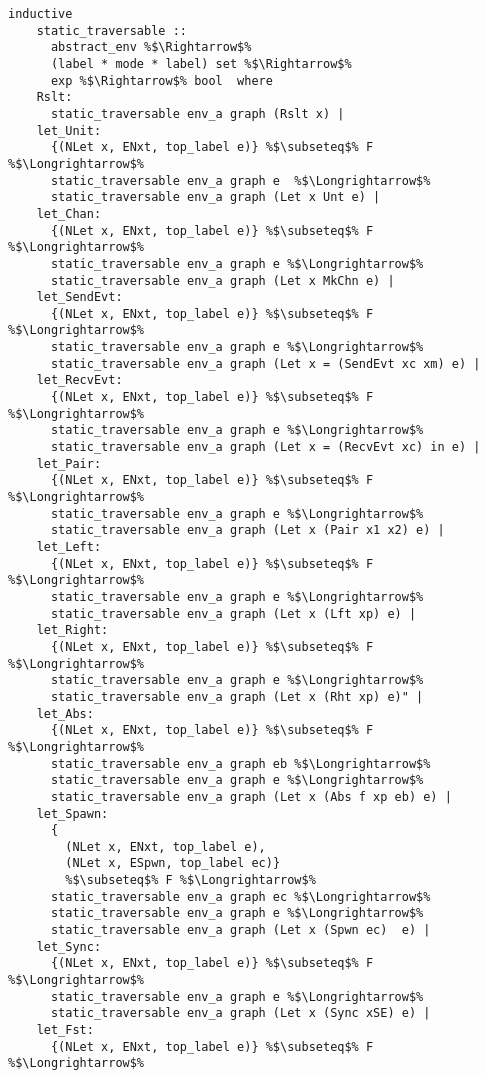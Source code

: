\begin{lstlisting}[style=codestyle1, escapechar=\%]
  inductive
    static_traversable ::
      abstract_env %$\Rightarrow$%
      (label * mode * label) set %$\Rightarrow$%
      exp %$\Rightarrow$% bool  where
    Rslt:
      static_traversable env_a graph (Rslt x) |
    let_Unit:
      {(NLet x, ENxt, top_label e)} %$\subseteq$% F %$\Longrightarrow$%
      static_traversable env_a graph e  %$\Longrightarrow$%
      static_traversable env_a graph (Let x Unt e) |
    let_Chan:
      {(NLet x, ENxt, top_label e)} %$\subseteq$% F %$\Longrightarrow$%
      static_traversable env_a graph e %$\Longrightarrow$%
      static_traversable env_a graph (Let x MkChn e) |
    let_SendEvt:
      {(NLet x, ENxt, top_label e)} %$\subseteq$% F %$\Longrightarrow$%
      static_traversable env_a graph e %$\Longrightarrow$%
      static_traversable env_a graph (Let x = (SendEvt xc xm) e) |
    let_RecvEvt:
      {(NLet x, ENxt, top_label e)} %$\subseteq$% F %$\Longrightarrow$%
      static_traversable env_a graph e %$\Longrightarrow$%
      static_traversable env_a graph (Let x = (RecvEvt xc) in e) |
    let_Pair:
      {(NLet x, ENxt, top_label e)} %$\subseteq$% F %$\Longrightarrow$%
      static_traversable env_a graph e %$\Longrightarrow$%
      static_traversable env_a graph (Let x (Pair x1 x2) e) |
    let_Left:
      {(NLet x, ENxt, top_label e)} %$\subseteq$% F %$\Longrightarrow$%
      static_traversable env_a graph e %$\Longrightarrow$%
      static_traversable env_a graph (Let x (Lft xp) e) |
    let_Right:
      {(NLet x, ENxt, top_label e)} %$\subseteq$% F %$\Longrightarrow$%
      static_traversable env_a graph e %$\Longrightarrow$%
      static_traversable env_a graph (Let x (Rht xp) e)" |
    let_Abs:
      {(NLet x, ENxt, top_label e)} %$\subseteq$% F %$\Longrightarrow$%
      static_traversable env_a graph eb %$\Longrightarrow$%
      static_traversable env_a graph e %$\Longrightarrow$%
      static_traversable env_a graph (Let x (Abs f xp eb) e) |
    let_Spawn:
      {
        (NLet x, ENxt, top_label e),
        (NLet x, ESpwn, top_label ec)}
        %$\subseteq$% F %$\Longrightarrow$%
      static_traversable env_a graph ec %$\Longrightarrow$%
      static_traversable env_a graph e %$\Longrightarrow$%
      static_traversable env_a graph (Let x (Spwn ec)  e) |
    let_Sync:
      {(NLet x, ENxt, top_label e)} %$\subseteq$% F %$\Longrightarrow$%
      static_traversable env_a graph e %$\Longrightarrow$%
      static_traversable env_a graph (Let x (Sync xSE) e) |
    let_Fst:
      {(NLet x, ENxt, top_label e)} %$\subseteq$% F %$\Longrightarrow$%

\end{lstlisting}
